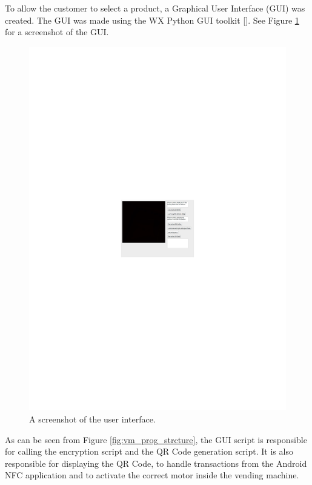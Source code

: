 To allow the customer to select a product, a Graphical User Interface (GUI) was
created. The GUI was made using the WX Python GUI toolkit
[\cite{website:wx-python}].
See Figure \ref{fig:gui-screenshot} for a screenshot of the
GUI.

\begin{figure}
 \centering 
 \includegraphics[clip = true, trim = 190 350 0 350, scale=2]{gui_screenshot}
 \caption{A screenshot of the user interface.}
 \label{fig:gui-screenshot}
\end{figure}

As can be seen from Figure \ref{fig:vm_prog_strcture}, the GUI script is
responsible for calling the encryption script and the QR Code generation script.
It is also responsible for displaying the QR Code, to handle transactions from
the Android NFC application and to activate the correct motor inside the vending
machine. 

